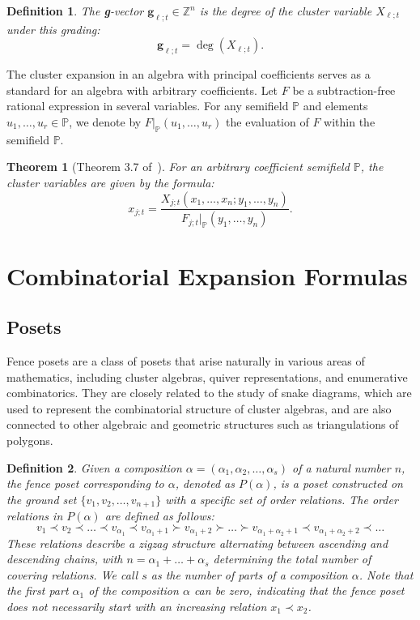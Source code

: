 \documentclass{article}
\newtheorem{definition}{Definition}
\newtheorem{theorem}{Theorem}
\theoremstyle{remark}
\begin{document}
\begin{definition}
The \emph{\textbf{g}-vector} $\mathbf{g}_{\ell;t} \in \mathbb{Z}^n$ is the degree of the cluster variable $X_{\ell;t}$ under this grading:
\[
\mathbf{g}_{\ell;t} = \deg(X_{\ell;t}).
\]
\end{definition}

The cluster expansion in an algebra with principal coefficients serves as a standard for an algebra with arbitrary coefficients. Let $F$ be a subtraction-free rational expression in several variables. For any semifield $\mathbb{P}$ and elements $u_1, \ldots, u_r \in \mathbb{P}$, we denote by $F|_{\mathbb{P}}(u_1, \ldots, u_r)$ the evaluation of $F$ within the semifield $\mathbb{P}$.

\begin{theorem}[Theorem 3.7 of~\cite{FZ2007}]
For an arbitrary coefficient semifield $\mathbb{P}$, the cluster variables are given by the formula:
\[
x_{j;t} = \frac{X_{j;t}(x_1, \ldots, x_n; y_1, \ldots, y_n)}{F_{j;t}|_{\mathbb{P}}(y_1, \ldots, y_n)}.
\]
\end{theorem}


\section{Combinatorial Expansion Formulas}\label{sec:combi}


\subsection{Posets}

Fence posets are a class of posets that arise naturally in various areas of mathematics, including cluster algebras, quiver representations, and enumerative combinatorics. They are closely related to the study of snake diagrams, which are used to represent the combinatorial structure of cluster algebras, and are also connected to other algebraic and geometric structures such as triangulations of polygons. 

\begin{definition}
    Given a composition \(\alpha = (\alpha_1, \alpha_2, \ldots, \alpha_s)\) of a natural number \(n\), the \emph{fence poset} corresponding to \(\alpha\), denoted as \(P(\alpha)\), is a poset constructed on the ground set \(\{v_1, v_2, \ldots, v_{n+1}\}\) with a specific set of order relations. The order relations in \(P(\alpha)\) are defined as follows: 
    \[
    v_1 \prec v_2 \prec \dots \prec v_{\alpha_1} \prec v_{\alpha_1+1} \succ v_{\alpha_1+2} \succ \dots \succ v_{\alpha_1+\alpha_2+1} \prec v_{\alpha_1+\alpha_2+2} \prec \dots
    \]
    These relations describe a zigzag structure alternating between ascending and descending chains, with \( n = \alpha_1 + \dots + \alpha_s \) determining the total number of covering relations. We call $s$ as the number of parts of a composition $\alpha$.
    Note that the first part $\alpha_1$ of the composition $\alpha$ can be zero, indicating that the fence poset does not necessarily start with an increasing relation $x_1 \prec x_2$.
\end{definition}
\end{document}
